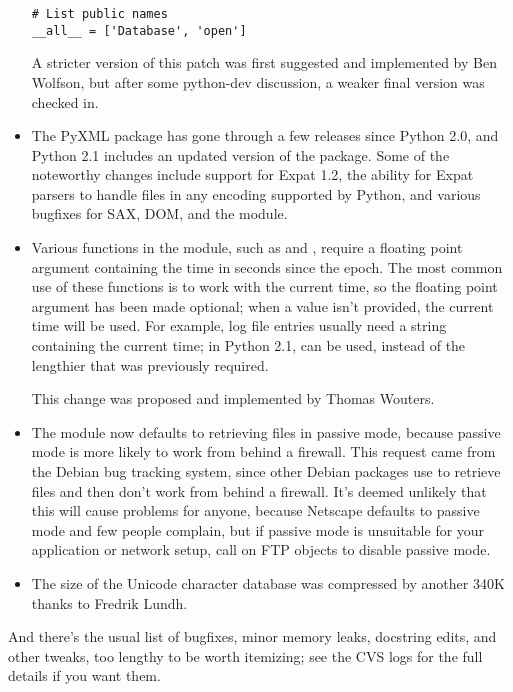 \documentclass{howto}
\begin{document}
\begin{itemize}
\begin{verbatim}
# List public names
__all__ = ['Database', 'open']
\end{verbatim}

A stricter version of this patch was first suggested and implemented
by Ben Wolfson, but after some python-dev discussion, a weaker
final version was checked in.

\item The PyXML package has gone through a few releases since Python
2.0, and Python 2.1 includes an updated version of the 
package.  Some of the noteworthy changes include support for Expat
1.2, the ability for Expat parsers to handle files in any encoding
supported by Python, and various bugfixes for SAX, DOM, and the
 module.

\item Various functions in the  module, such as
 and ,
require a floating point argument containing the time in seconds since
the epoch.  The most common use of these functions is to work with the
current time, so the floating point argument has been made optional;
when a value isn't provided, the current time will be used.  For
example, log file entries usually need a string containing the current
time; in Python 2.1,  can be used, instead of the
lengthier  that was
previously required.
 
This change was proposed and implemented by Thomas Wouters.

\item The  module now defaults to retrieving files in passive mode,
because passive mode is more likely to work from behind a firewall.
This request came from the Debian bug tracking system, since other
Debian packages use  to retrieve files and then don't
work from behind a firewall.  It's deemed unlikely that this will
cause problems for anyone, because Netscape defaults to passive mode
and few people complain, but if passive mode is unsuitable for your
application or network setup, call
 on FTP objects to disable passive mode.  

\item The size of the Unicode character database was compressed by another 340K thanks to Fredrik Lundh.

\end{itemize}

And there's the usual list of bugfixes, minor memory leaks, docstring
edits, and other tweaks, too lengthy to be worth itemizing; see the
CVS logs for the full details if you want them.
\end{document}
